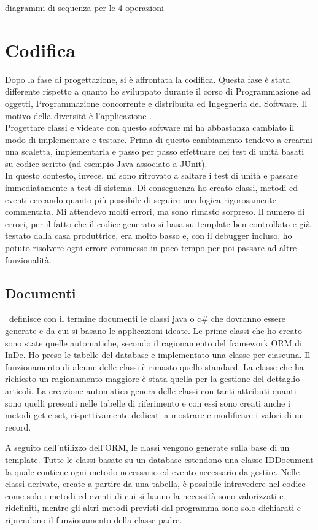 \todo diagrammi di sequenza per le 4 operazioni


\section{Codifica}
Dopo la fase di progettazione, si è affrontata la codifica. Questa fase è stata differente rispetto a quanto ho sviluppato durante il corso di Programmazione ad oggetti, Programmazione concorrente e distribuita ed Ingegneria del Software. Il motivo della diversità è l'applicazione \inde.\\
Progettare classi e videate con questo software mi ha abbastanza cambiato il modo di implementare e testare. Prima di questo cambiamento tendevo a crearmi una scaletta, implementarla e passo per passo effettuare dei test di unità basati su codice scritto (ad esempio Java associato a JUnit).\\
In questo contesto, invece, mi sono ritrovato a saltare i test di unità e passare immediatamente a test di sistema. Di conseguenza ho creato classi, metodi ed eventi cercando quanto più possibile di seguire una logica rigorosamente commentata. Mi attendevo molti errori, ma sono rimasto sorpreso. Il numero di errori, per il fatto che il codice generato si basa su template ben controllato e già testato dalla casa produttrice, era molto basso e, con il debugger incluso, ho potuto risolvere ogni errore commesso in poco tempo per poi passare ad altre funzionalità.

\subsection{Documenti}
\inde\ definisce con il termine documenti le classi java o c\# che dovranno essere generate e da cui si basano le applicazioni ideate.
Le prime classi che ho creato sono state quelle automatiche, secondo il ragionamento del framework ORM di InDe. Ho preso le tabelle del database e implementato una classe per ciascuna. Il funzionamento di alcune delle classi è rimasto quello standard. La classe che ha richiesto un ragionamento maggiore è stata quella per la gestione del dettaglio articoli.
La creazione automatica genera delle classi con tanti attributi quanti sono quelli presenti nelle tabelle di riferimento e con essi sono creati anche i metodi get e set, rispettivamente dedicati a mostrare e modificare i valori di un record.

A seguito dell'utilizzo dell'ORM, le classi vengono generate sulla base di un template. Tutte le classi basate su un database estendono una classe IDDocument la quale contiene ogni metodo necessario ed evento necessario da gestire. Nelle classi derivate, create a partire da una tabella, è possibile intravedere nel codice come solo i metodi ed eventi di cui si hanno la necessità sono valorizzati e ridefiniti, mentre gli altri metodi previsti dal programma sono solo dichiarati e riprendono il funzionamento della classe padre.

